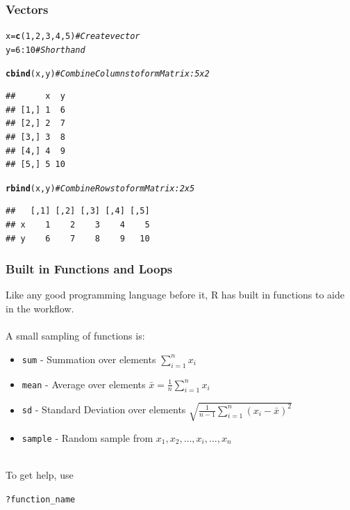 \documentclass{beamer}\usepackage[]{graphicx}\usepackage[]{color}
\makeatletter
\newcommand{\hlnum}[1]{\textcolor[rgb]{0.686,0.059,0.569}{#1}}%
\newcommand{\hlcom}[1]{\textcolor[rgb]{0.678,0.584,0.686}{\textit{#1}}}%
\newcommand{\hlopt}[1]{\textcolor[rgb]{0,0,0}{#1}}%
\newcommand{\hlstd}[1]{\textcolor[rgb]{0.345,0.345,0.345}{#1}}%
\newcommand{\hlkwb}[1]{\textcolor[rgb]{0.69,0.353,0.396}{#1}}%
\newcommand{\hlkwd}[1]{\textcolor[rgb]{0.737,0.353,0.396}{\textbf{#1}}}%
\newenvironment{kframe}{%
 \def\at@end@of@kframe{}%
 \ifinner\ifhmode%
  \def\at@end@of@kframe{\end{minipage}}%
  \begin{minipage}{\columnwidth}%
 \fi\fi%
 \def\FrameCommand##1{\hskip\@totalleftmargin \hskip-\fboxsep
 \colorbox{shadecolor}{##1}\hskip-\fboxsep
     \hskip-\linewidth \hskip-\@totalleftmargin \hskip\columnwidth}%
 \MakeFramed {\advance\hsize-\width
   \@totalleftmargin\z@ \linewidth\hsize
   \@setminipage}}%
 {\par\unskip\endMakeFramed%
 \at@end@of@kframe}
\newenvironment{knitrout}{}{} %
\makeatother
\begin{document}
\begin{frame}[fragile]
\frametitle{Vectors}
\begin{knitrout}\small
{}\color{fgcolor}\begin{kframe}
\begin{alltt}
\hlstd{x} \hlkwb{=} \hlkwd{c}\hlstd{(}\hlnum{1}\hlstd{,}\hlnum{2}\hlstd{,}\hlnum{3}\hlstd{,}\hlnum{4}\hlstd{,}\hlnum{5}\hlstd{)} \hlcom{# Create vector}
\hlstd{y} \hlkwb{=} \hlnum{6}\hlopt{:}\hlnum{10}         \hlcom{# Shorthand}

\hlkwd{cbind}\hlstd{(x, y)}      \hlcom{# Combine Columns to form Matrix: 5 x 2}
\end{alltt}
\begin{verbatim}
##      x  y
## [1,] 1  6
## [2,] 2  7
## [3,] 3  8
## [4,] 4  9
## [5,] 5 10
\end{verbatim}
\begin{alltt}
\hlkwd{rbind}\hlstd{(x, y)}      \hlcom{# Combine Rows to form Matrix: 2 x 5}
\end{alltt}
\begin{verbatim}
##   [,1] [,2] [,3] [,4] [,5]
## x    1    2    3    4    5
## y    6    7    8    9   10
\end{verbatim}
\end{kframe}
\end{knitrout}
\end{frame}

\begin{frame}[fragile]
\frametitle{Built in Functions and Loops}

Like any good programming language before it, R has built in functions to aide in the workflow.
\\$ $\\ A small sampling of functions is:
\begin{itemize}
\item \texttt{sum} - Summation over elements $\sum\limits_{i = 1}^n {{x_i}}$
\item \texttt{mean} - Average over elements $\bar x = \frac{1}{n}\sum\limits_{i = 1}^n {{x_i}}$
\item \texttt{sd} - Standard Deviation over elements $\sqrt {\frac{1}{{n - 1}}\sum\limits_{i = 1}^n {{{\left( {{x_i} - \bar x} \right)}^2}} }$
\item \texttt{sample} - Random sample from ${x_1}, {x_2}, \ldots, {x_i}, \ldots, {x_n} $
\end{itemize}

$ $\\ To get help, use 
\begin{knitrout}
\color{fgcolor}\begin{kframe}
\begin{alltt}
\hlopt{?}\hlstd{function_name}
\end{alltt}
\end{kframe}
\end{knitrout}
\end{frame}
\end{document}
